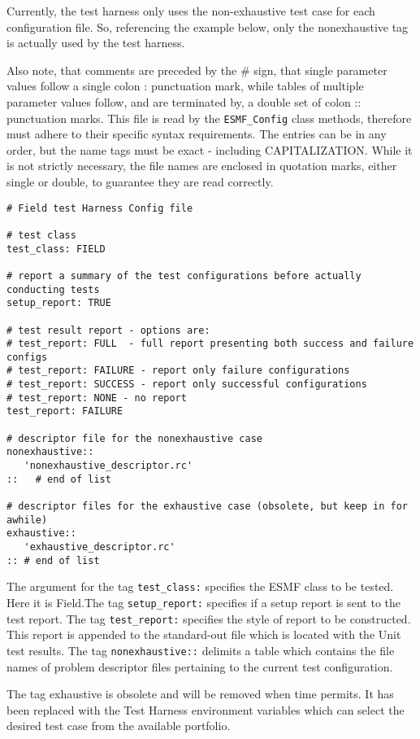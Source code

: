 Currently, the test harness only uses the non-exhaustive test case for each configuration file.
So, referencing the example below, only the nonexhaustive tag is actually used by the test harness. 

Also note, that comments are preceded by the {\#} sign, that single parameter values follow 
a single colon {:} punctuation mark, while tables of multiple parameter values follow, 
and are terminated by, a double set of colon {::} punctuation marks.  
This file is read by the \texttt{ESMF\_Config} class methods, therefore must adhere 
to their specific syntax requirements. 
The entries can be in any order, but the name tags must be exact - including CAPITALIZATION. 
While it is not strictly necessary, the file names are enclosed in quotation marks, 
either single or double, to guarantee they are read correctly.
\begin{verbatim}
# Field test Harness Config file

# test class
test_class: FIELD 

# report a summary of the test configurations before actually conducting tests
setup_report: TRUE

# test result report - options are:
# test_report: FULL  - full report presenting both success and failure configs
# test_report: FAILURE - report only failure configurations
# test_report: SUCCESS - report only successful configurations
# test_report: NONE - no report
test_report: FAILURE

# descriptor file for the nonexhaustive case
nonexhaustive::
   'nonexhaustive_descriptor.rc'
::   # end of list

# descriptor files for the exhaustive case (obsolete, but keep in for awhile)
exhaustive::
   'exhaustive_descriptor.rc'
:: # end of list
\end{verbatim}

The argument for the tag \texttt{test\_class:} specifies the ESMF class to be tested. 
Here it is Field.The tag  \texttt{setup\_report:} specifies if a setup report is sent to the test report. 
The tag  \texttt{test\_report:} specifies the style of report to be constructed. 
This report is appended to the standard-out file which is located with the Unit test results. 
The tag \texttt{nonexhaustive::} delimits a table which contains the file names of 
problem descriptor files pertaining to the current test configuration. 

The tag exhaustive is obsolete and will be removed when time permits.  It has been replaced with the Test Harness
environment variables which can select the desired test case from the available portfolio.

